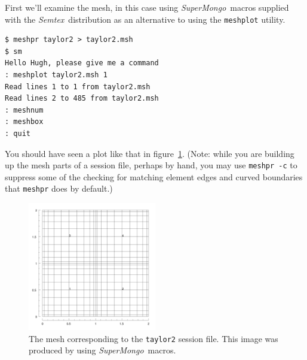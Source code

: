 \documentclass[11pt]{report}
\newcommand{\Semtex}{\emph{Semtex}} \newcommand{\Dog}{\emph{Dog}}
\newcommand{\SM}{\emph{SuperMongo}}
\begin{document}
First we'll examine the mesh, in this case using \SM\ macros supplied with the
\Semtex\ distribution as an alternative to using the \verb|meshplot|
utility.
%
{\small
\begin{verbatim}
$ meshpr taylor2 > taylor2.msh
$ sm
Hello Hugh, please give me a command
: meshplot taylor2.msh 1
Read lines 1 to 1 from taylor2.msh
Read lines 2 to 485 from taylor2.msh
: meshnum
: meshbox
: quit
\end{verbatim}
}
\noindent
You should have seen a plot like that in figure~\ref{tay2msh}. (Note:
while you are building up the mesh parts of a session file, perhaps by
hand, you may use \texttt{meshpr -c} to suppress some of the checking
for matching element edges and curved boundaries that \texttt{meshpr}
does by default.)
\begin{figure}
\begin{center}
\includegraphics[width=0.5\textwidth]{taylor2mesh}
\end{center}
\caption{
\label{tay2msh}
  The mesh corresponding to the \texttt{taylor2} session file.  This
  image was produced by using \SM\ macros.  }
\end{figure}

\end{document}
